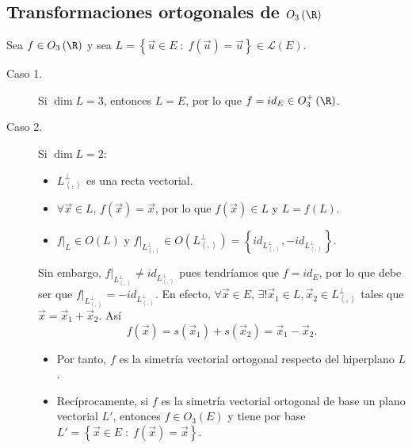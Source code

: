 \subsection{Transformaciones ortogonales de $\displaystyle O_{3}\left(\R\right) $}
Sea $\displaystyle f \in O_{3}\left(\R\right) $ y sea $\displaystyle L = \left\{ \vec{u}\in E\; : \; f\left(\vec{u}\right) = \vec{u}\right\} \in \mathcal{L}\left(E\right) $.
\begin{description}
\item[Caso 1.] Si $\displaystyle \dim L = 3 $, entonces $\displaystyle L = E $, por lo que $\displaystyle f = id _{E} \in O^{+}_{3}\left(\R\right) $.
\item[Caso 2.] Si $\displaystyle \dim L = 2 $:
	\begin{itemize}
	\item $\displaystyle L^{\perp }_{\left\langle ,  \right\rangle } $ es una recta vectorial.
	\item $\displaystyle \forall \vec{x} \in L $, $\displaystyle f\left(\vec{x}\right) = \vec{x} $, por lo que $\displaystyle f\left(\vec{x}\right) \in L $ y $\displaystyle L = f\left(L\right) $.
	\item $\displaystyle f|_{L} \in O\left(L\right) $ y $\displaystyle f|_{L^{\perp }_{\left\langle ,  \right\rangle }} \in O\left(L^{\perp }_{\left\langle ,  \right\rangle }\right) = \left\{ id _{L^{\perp }_{\left\langle ,  \right\rangle }}, - id _{L^{\perp }_{\left\langle ,  \right\rangle }}\right\}  $.
	\end{itemize}
	 Sin embargo, $\displaystyle f|_{L^{\perp }_{\left\langle ,  \right\rangle }} \neq id _{L^{\perp }_{\left\langle ,  \right\rangle }}  $ pues tendríamos que $\displaystyle f = id _{E} $, por lo que debe ser que $\displaystyle f|_{L^{\perp }_{\left\langle ,  \right\rangle }} = - id _{L^{\perp }_{\left\langle ,  \right\rangle }} $. En efecto, $\displaystyle \forall \vec{x} \in E $, $\displaystyle \exists ! \vec{x}_{1} \in L, \vec{x}_{2} \in L^{\perp }_{\left\langle ,  \right\rangle } $ tales que $\displaystyle \vec{x} = \vec{x}_{1} + \vec{x}_{2} $. Así
	\[f\left(\vec{x}\right) = s\left(\vec{x}_{1}\right) + s\left(\vec{x}_{2}\right) = \vec{x}_{1}-\vec{x}_{2} .\]
	\begin{itemize}
	\item Por tanto, $\displaystyle f $ es la simetría vectorial ortogonal respecto del hiperplano $\displaystyle L $.
	\item Recíprocamente, si $\displaystyle f $ es la simetría vectorial ortogonal de base un plano vectorial $\displaystyle L' $, entonces $\displaystyle f \in O_{3}\left(E\right) $ y tiene por base $\displaystyle L' = \left\{ \vec{x} \in E \; : \; f\left(\vec{x}\right) = \vec{x}\right\}  $.

\end{itemize}
\end{description}
